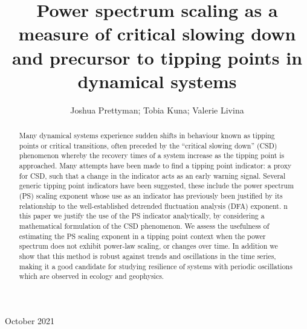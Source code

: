 \documentclass[10pt]{iopart}
\newcommand{\revision}[1]{}
\begin{document}
\title[Power spectrum scaling as a measure of critical slowing down]{Power spectrum scaling as a measure of critical slowing down and precursor to tipping points in dynamical systems}

\author{Joshua Prettyman; Tobia Kuna; Valerie Livina}

\address{}
\vspace{10pt}
\begin{indented}
	\item[] October 2021
\end{indented}

\begin{abstract}
Many dynamical systems experience sudden shifts in behaviour known as tipping points or critical transitions, often preceded by the ``critical slowing down'' (CSD) phenomenon whereby the recovery times of a system increase as the tipping point is approached. Many attempts have been made to find a tipping point indicator: a proxy for CSD, such that a change in the indicator acts as an early warning signal. Several generic tipping point indicators have been suggested, these include the power spectrum (PS) scaling exponent whose use as an indicator has previously been justified by its relationship to the well-established detrended fluctuation analysis (DFA) exponent. {\revision In this paper we justify the use of the PS indicator analytically, by considering a mathematical formulation of the CSD phenomenon}. We assess the usefulness of estimating the PS scaling exponent in a tipping point context when the power spectrum does not exhibit power-law scaling, or changes over time. In addition we show that this method is robust against trends and oscillations in the time series, making it a good candidate for studying resilience of systems with periodic oscillations which are observed in ecology and geophysics. 
\end{abstract}


\submitto{\ERL}
\ioptwocol
\end{document}
